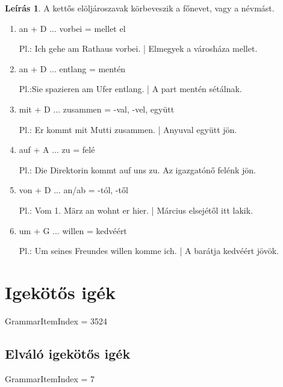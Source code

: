 \documentclass{article}
\theoremstyle{definition}
\newtheorem*{desc}{Leírás}
\begin{document}
\begin{desc}
A kettős elöljároszavak körbeveszik a főnevet, vagy a névmást.

\begin{enumerate}
\item an + D ... vorbei = mellet el

Pl.: Ich gehe am Rathaus vorbei. | Elmegyek a városháza mellet.

\item an + D ... entlang = mentén

Pl.:Sie spazieren am Ufer entlang. | A part mentén sétálnak.

\item mit + D ... zusammen = -val, -vel, együtt

Pl.: Er kommt mit Mutti zusammen. | Anyuval együtt jön.

\item auf + A ... zu = felé

Pl.: Die Direktorin kommt auf uns zu. Az igazgatónő felénk jön.

\item von + D ... an/ab = -tól, -től

Pl.: Vom 1. März an wohnt er hier. | Március elsejétől itt lakik.

\item um + G ... willen = kedvéért

Pl.: Um seines Freundes willen komme ich. | A barátja kedvéért jövök. 
\end{enumerate}
\end{desc}

\section{Igekötős igék}

GrammarItemIndex = 3524

\subsection{Elváló igekötős igék}

GrammarItemIndex = 7
\end{document}
